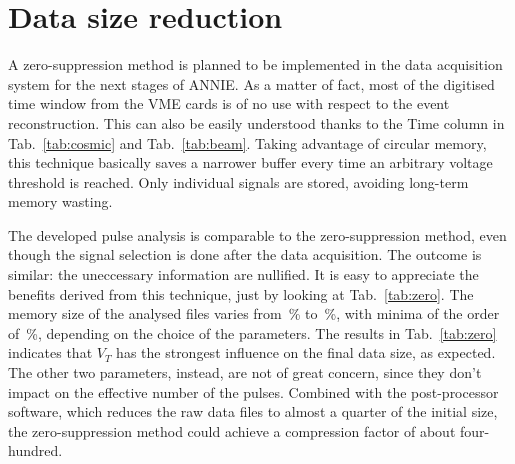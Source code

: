\section{Data size reduction}
\label{sec:zero}

 A zero-suppression method is planned to be implemented in the data acquisition system for the next stages of ANNIE.
 As a matter of fact, most of the digitised time window from the VME cards is of no use with respect to the %
 event reconstruction.
 This can also be easily understood thanks to the Time column in Tab.~\ref{tab:cosmic} and Tab.~\ref{tab:beam}.
 Taking advantage of circular memory, this technique basically saves a narrower buffer every time an arbitrary %
 voltage threshold is reached.
 Only individual signals are stored, avoiding long-term memory wasting.

 The developed pulse analysis is comparable to the zero-suppression method, even though the signal selection %
 is done after the data acquisition.
 The outcome is similar: the uneccessary information are nullified.
 It is easy to appreciate the benefits derived from this technique, just by looking at Tab.~\ref{tab:zero}.
 The memory size of the analysed files varies from \,\% to \,\%, with minima of the order of %
 \,\%, depending on the choice of the parameters.
 The results in Tab.~\ref{tab:zero} indicates that $V_T$ has the strongest influence on the final data size, %
 as expected.
 The other two parameters, instead, are not of great concern, since they don't impact on the effective number %
 of the pulses.
 Combined with the post-processor software, which reduces the raw data files to almost a quarter of the initial %
 size, the zero-suppression method could achieve a compression factor of about four-hundred.

